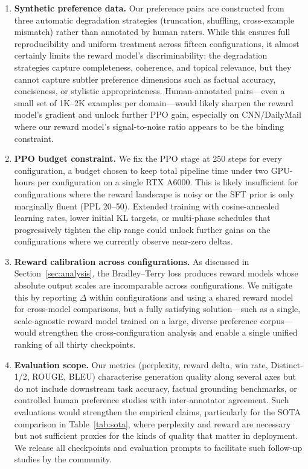 \documentclass[10pt,twocolumn,letterpaper]{article}
\begin{document}
\begin{enumerate}[topsep=2pt, itemsep=1pt, label=\textbf{L\arabic*.}]
  \item \textbf{Synthetic preference data.} Our preference pairs are constructed from three automatic degradation strategies (truncation, shuffling, cross-example mismatch) rather than annotated by human raters. While this ensures full reproducibility and uniform treatment across fifteen configurations, it almost certainly limits the reward model's discriminability: the degradation strategies capture completeness, coherence, and topical relevance, but they cannot capture subtler preference dimensions such as factual accuracy, conciseness, or stylistic appropriateness. Human-annotated pairs---even a small set of 1K--2K examples per domain---would likely sharpen the reward model's gradient and unlock further PPO gain, especially on CNN/DailyMail where our reward model's signal-to-noise ratio appears to be the binding constraint.

  \item \textbf{PPO budget constraint.} We fix the PPO stage at 250 steps for every configuration, a budget chosen to keep total pipeline time under two GPU-hours per configuration on a single RTX A6000. This is likely insufficient for configurations where the reward landscape is noisy or the SFT prior is only marginally fluent (PPL 20--50). Extended training with cosine-annealed learning rates, lower initial KL targets, or multi-phase schedules that progressively tighten the clip range could unlock further gains on the configurations where we currently observe near-zero deltas.

  \item \textbf{Reward calibration across configurations.} As discussed in Section~\ref{sec:analysis}, the Bradley--Terry loss produces reward models whose absolute output scales are incomparable across configurations. We mitigate this by reporting $\Delta$ within configurations and using a shared reward model for cross-model comparisons, but a fully satisfying solution---such as a single, scale-agnostic reward model trained on a large, diverse preference corpus---would strengthen the cross-configuration analysis and enable a single unified ranking of all thirty checkpoints.

  \item \textbf{Evaluation scope.} Our metrics (perplexity, reward delta, win rate, Distinct-1/2, ROUGE, BLEU) characterise generation quality along several axes but do not include downstream task accuracy, factual grounding benchmarks, or controlled human preference studies with inter-annotator agreement. Such evaluations would strengthen the empirical claims, particularly for the SOTA comparison in Table~\ref{tab:sota}, where perplexity and reward are necessary but not sufficient proxies for the kinds of quality that matter in deployment. We release all checkpoints and evaluation prompts to facilitate such follow-up studies by the community.
\end{enumerate}
\end{document}
